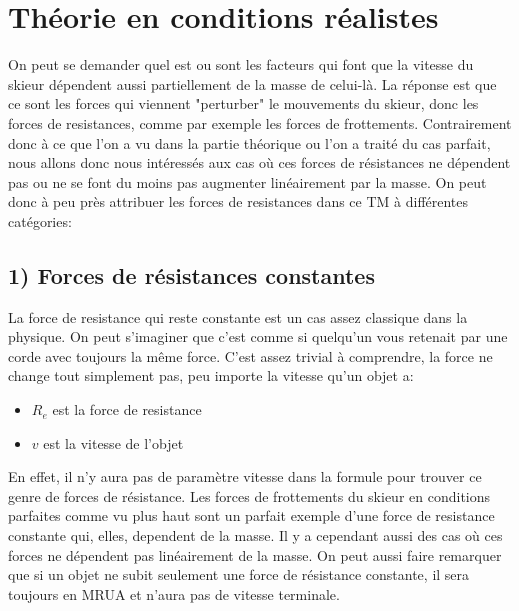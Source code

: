 \documentclass{article}
\begin{document}
\section{Théorie en conditions réalistes}

On peut se demander quel est ou sont les facteurs qui font que la vitesse du skieur dépendent aussi partiellement de la masse de celui-là. La réponse est que ce sont les forces qui viennent "perturber" le mouvements du skieur, donc les forces de resistances, comme par exemple les forces de frottements. Contrairement donc à ce que l'on a vu dans la partie théorique ou l'on a traité du cas parfait, nous allons donc nous intéressés aux cas où ces forces de résistances ne dépendent pas ou ne se font du moins pas augmenter linéairement par la masse. On peut donc à peu près attribuer les forces de resistances dans ce TM à différentes catégories:

\subsection{1) Forces de résistances constantes}
La force de resistance qui reste constante est un cas assez classique dans la physique. On peut s'imaginer que c'est comme si quelqu'un vous retenait par une corde avec toujours la même force. C'est assez trivial à comprendre, la force ne change tout simplement pas, peu importe la vitesse qu'un objet a:

\begin{center}


\begin{itemize}
    \item $R_e$ est la force de resistance
    \item $v$ est la vitesse de l'objet
\end{itemize}
\end{center}

\vspace{0.3cm}
En effet, il n'y aura pas de paramètre vitesse dans la formule pour trouver ce genre de forces de résistance. Les forces de frottements du skieur en conditions parfaites comme vu plus haut sont un parfait exemple d'une force de resistance constante qui, elles, dependent de la masse. Il y a cependant aussi des cas où ces forces ne dépendent pas linéairement de la masse.
\newline On peut aussi faire remarquer que si un objet ne subit seulement une force de résistance constante, il sera toujours en MRUA et n'aura pas de vitesse terminale. 
\end{document}
